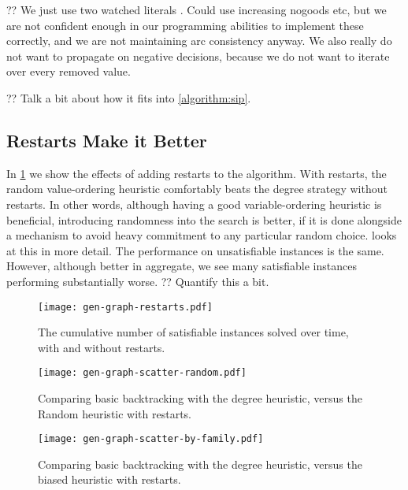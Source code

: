 \documentclass{article}
\newcommand{\citep}[1]{\cite{#1}}
\begin{document}
?? We just use two watched literals \citep{DBLP:conf/dac/MoskewiczMZZM01}. Could use increasing
nogoods \citep{DBLP:conf/aaai/LeeSZ16,DBLP:conf/cp/GlorianBLLM17} etc, but we are not confident enough
in our programming abilities to implement these correctly, and we are not maintaining arc
consistency anyway. We also really do not want to propagate on negative decisions, because we do not
want to iterate over every removed value.

?? Talk a bit about how it fits into \cref{algorithm:sip}.

\subsection{Restarts Make it Better}

In \cref{figure:restarts} we show the effects of adding restarts to the algorithm. With restarts,
the random value-ordering heuristic comfortably beats the degree strategy without restarts. In
other words, although having a good variable-ordering heuristic is beneficial, introducing
randomness into the search is better, if it is done alongside a mechanism to avoid heavy commitment
to any particular random choice.  looks at this in more detail.  The
performance on unsatisfiable instances is the same. However, although better in aggregate, we see
many satisfiable instances performing substantially worse. ?? Quantify this a bit.

\begin{figure}[p]
    \centering
    \texttt{[image: gen-graph-restarts.pdf]}

    \caption{The cumulative number of satisfiable instances solved over time, with and without
    restarts.}
    \label{figure:restarts}
\end{figure}

\begin{figure}[p]
    \centering
    \texttt{[image: gen-graph-scatter-random.pdf]}
    \caption{Comparing basic backtracking with the degree heuristic, versus the Random heuristic
    with restarts.}
    \label{figure:scatter-random}
\end{figure}

\begin{figure}[p]
    \centering
    \texttt{[image: gen-graph-scatter-by-family.pdf]}

    \caption{Comparing basic backtracking with the degree heuristic, versus the biased
    heuristic with restarts.}
    \label{figure:scatter-by-family}
\end{figure}
\end{document}
